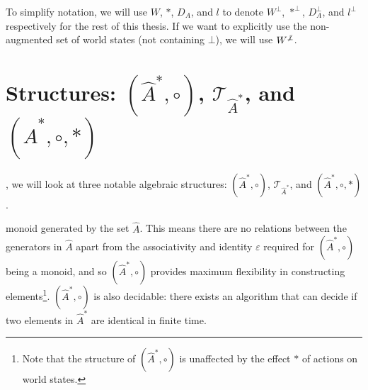 \begin{notation}
    To simplify notation, we will use $W$, $\ast$, $D_{A}$, and $l$ to denote $W^{\bot}$, $\ast^{\bot}$, $D_{A}^{\bot}$, and $l^{\bot}$ respectively for the rest of this thesis.
    If we want to explicitly use the non-augmented set of world states (not containing $\bot$), we will use $W^{\centernot\bot}$.
\end{notation}


\section{
Structures\texorpdfstring{: $(\hat{A}^{*}, \circ)$, $\mathcal{T}_{\hat{A}^{*}}$, and $(\hat{A}^{*}, \circ, \ast)$}{}
}

, we will look at three notable algebraic structures: $(\hat{A}^{*}, \circ)$, $\mathcal{T}_{\hat{A}^{*}}$, and $(\hat{A}^{*}, \circ, \ast)$.

 monoid generated by the set $\hat{A}$.
This means there are no relations between the generators in $\hat{A}$ apart from the associativity and identity $\varepsilon$ required for $(\hat{A}^{*}, \circ)$ being a monoid, and so $(\hat{A}^{*}, \circ)$ provides maximum flexibility in constructing elements\footnote{
Note that the structure of $(\hat{A}^{*}, \circ)$ is unaffected by the effect $\ast$ of actions on world states.
}.
$(\hat{A}^{*}, \circ)$ is also decidable: there exists an algorithm that can decide if two elements in $\hat{A}^{*}$ are identical in finite time.


